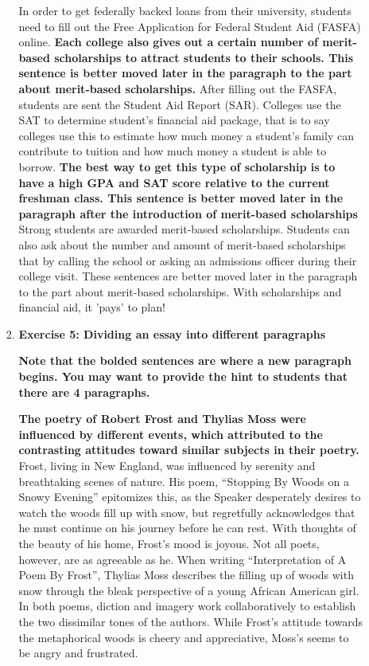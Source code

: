 \begin{enumerate}
\begin{itemize}
\begin{enumerate}
In order to get federally backed loans from their university, students need to fill out the Free Application for Federal Student Aid (FASFA) online.\textbf{ Each college also gives out a certain number of merit-based scholarships to attract students to their schools. This sentence is better moved later in the paragraph to the part about merit-based scholarships.} After filling out the FASFA, students are sent the Student Aid Report (SAR).  Colleges use the SAT to determine student's financial aid package, that is to say colleges use this to estimate how much money a student's family can contribute to tuition and how much money a student is able to borrow. \textbf{The best way to get this type of scholarship is to have a high GPA and SAT score relative to the current freshman class. This sentence is better moved later in the paragraph after the introduction of merit-based scholarships} Strong students are awarded merit-based scholarships. Students can also ask about the number and amount of merit-based scholarships that by calling the school or asking an admissions officer during their college visit.  These sentences are better moved later in the paragraph to the part about merit-based scholarships. With scholarships and financial aid, it 'pays' to plan!

\item \textbf{Exercise 5: Dividing an essay into different paragraphs}

\textbf{Note that the bolded sentences are where a new paragraph begins. You may want to provide the hint to students that there are 4 paragraphs.}

\textbf{The poetry of Robert Frost and Thylias Moss were influenced by different events, which attributed to the contrasting attitudes toward similar subjects in their poetry.}  Frost, living in New England, was influenced by serenity and breathtaking scenes of nature. His poem, “Stopping By Woods on a Snowy Evening” epitomizes this, as the Speaker desperately desires to watch the woods fill up with snow, but regretfully acknowledges that he must continue on his journey before he can rest. With thoughts of the beauty of his home, Frost's mood is joyous. Not all poets, however, are as agreeable as he. When writing “Interpretation of A Poem By Frost”, Thylias Moss describes the filling up of woods with snow through the bleak perspective of a young African American girl. In both poems, diction and imagery work collaboratively to establish the two dissimilar tones of the authors. While Frost's attitude towards the metaphorical woods is cheery and appreciative, Moss's seems to be angry and frustrated. 


\end{enumerate}
\end{itemize}
\end{enumerate}
